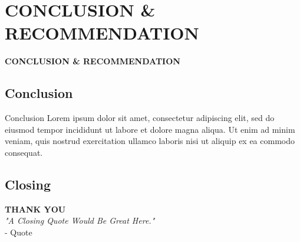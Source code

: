 \documentclass[11pt]{beamer}%
\begin{document}
\section{CONCLUSION \& RECOMMENDATION}
\begin{frame}{}
	\begin{center} 
		\textbf{\huge CONCLUSION \& RECOMMENDATION}\vspace{-30pt} 
	\end{center}
\end{frame}

\subsection{Conclusion}
\begin{frame}{Conclusion}
	Lorem ipsum dolor sit amet, consectetur adipiscing elit, sed do eiusmod tempor incididunt ut labore et dolore magna aliqua. Ut enim ad minim veniam, quis nostrud exercitation ullamco laboris nisi ut aliquip ex ea commodo consequat.
\end{frame}

\subsection{Closing}
\begin{frame}
	\begin{center} 
	\vspace{35pt}  
	\textbf{\huge THANK YOU}\\
	\vspace{10pt} 
	\textit{"A Closing Quote Would Be Great Here."} \\- Quote
\end{center}
\end{frame}
\end{document}
